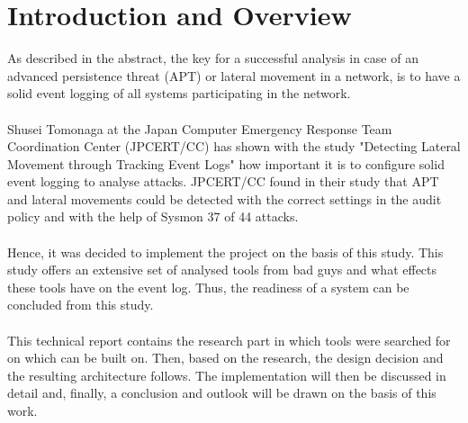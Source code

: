 \section{Introduction and Overview}
As described in the abstract, the key for a successful analysis in case of an advanced persistence threat (APT) or lateral movement in a network, is to have a solid event logging of all systems participating in the network.
\\\\
Shusei Tomonaga at the Japan Computer Emergency Response Team Coordination Center (JPCERT/CC) has shown with the study "Detecting Lateral Movement through Tracking Event Logs" \cite{JPCERTDetectingLateralMovement} how important it is to configure solid event logging to analyse attacks. JPCERT/CC found in their study that APT and lateral movements could be detected with the correct settings in the audit policy and with the help of Sysmon 37 of 44 attacks.
\\\\
Hence, it was decided to implement the project on the basis of this study. This study offers an extensive set of analysed tools from bad guys and what effects these tools have on the event log. Thus, the readiness of a system can be concluded from this study. 
\\\\
This technical report contains the research part in which tools were searched for on which can be built on. Then, based on the research, the design decision and the resulting architecture follows. The implementation will then be discussed in detail and, finally, a conclusion and outlook will be drawn on the basis of this work.